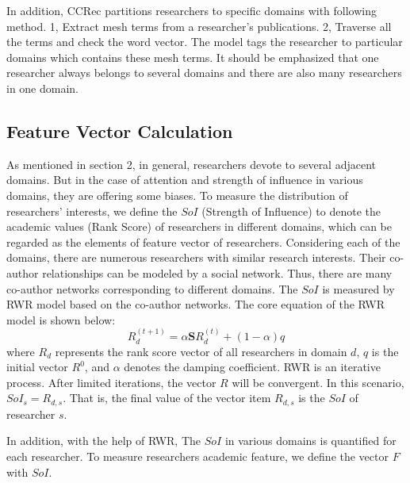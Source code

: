 \documentclass{acm_proc_article-sp}
\begin{document}
In addition, CCRec partitions researchers to specific domains with following method. 1, Extract mesh terms from a researcher's publications. 2, Traverse all the terms and check the word vector. The model tags the researcher to particular domains which contains these mesh terms. It should be emphasized that one researcher always belongs to several domains and there are also many researchers in one domain.

\subsection{Feature Vector Calculation}
As mentioned in section 2, in general, researchers devote to several adjacent domains. But in the case of attention and strength of influence in various domains, they are offering some biases. To measure the distribution of researchers' interests, we define the $SoI$ (Strength of Influence) to denote the academic values (Rank Score) of researchers in different domains, which can be regarded as the elements of feature vector of researchers. Considering each of the domains, there are numerous researchers with similar research interests. Their co-author relationships can be modeled by a social network. Thus, there are many co-author networks corresponding to different domains. The $SoI$ is measured by RWR model based on the co-author networks. The core equation of the RWR model is shown below:
\begin{equation}
R_{d}^{(t+1)}=\alpha \mathbf{S}R_{d}^{(t)}+(1-\alpha)q
\end{equation}
where $R_{d}$ represents the rank score vector of all researchers in domain $d$, $q$ is the initial vector $R^0$, and $\alpha$ denotes the damping coefficient. RWR is an iterative process. After limited iterations, the vector $R$ will be convergent. In this scenario, $SoI_{s}=R_{d,s}$. That is, the final value of the vector item $R_{d,s}$ is the $SoI$ of researcher $s$.


In addition, with the help of RWR, The $SoI$ in various domains is quantified for each researcher. To measure researchers academic feature, we define the vector $F$ with $SoI$.
\end{document}
